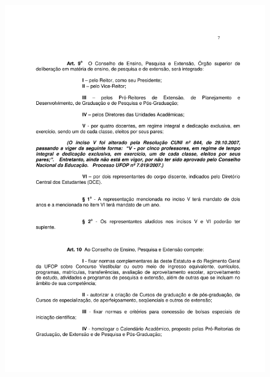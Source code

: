 \begin{figure}[p]
	\centering 
	\includegraphics[scale=0.7]{capitulos/resolucoes/cuni414/cuni414-7.pdf}
\end{figure}

